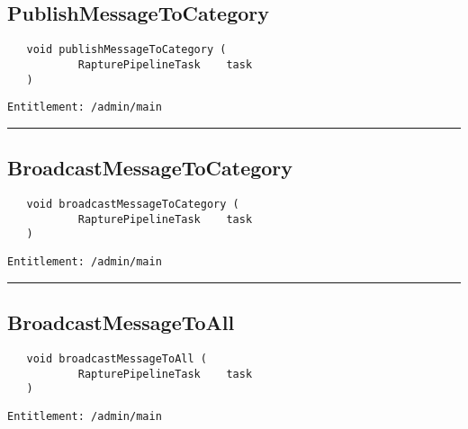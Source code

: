 \subsection{PublishMessageToCategory}
\label{Api:PublishMessageToCategory}
\begin{Verbatim}
   void publishMessageToCategory (
           RapturePipelineTask    task
   )
\end{Verbatim}
\begin{Verbatim}[formatcom=\color{Maroon}]
  Entitlement: /admin/main
\end{Verbatim}



\rule{12cm}{2pt}
\subsection{BroadcastMessageToCategory}
\label{Api:BroadcastMessageToCategory}
\begin{Verbatim}
   void broadcastMessageToCategory (
           RapturePipelineTask    task
   )
\end{Verbatim}
\begin{Verbatim}[formatcom=\color{Maroon}]
  Entitlement: /admin/main
\end{Verbatim}



\rule{12cm}{2pt}
\subsection{BroadcastMessageToAll}
\label{Api:BroadcastMessageToAll}
\begin{Verbatim}
   void broadcastMessageToAll (
           RapturePipelineTask    task
   )
\end{Verbatim}
\begin{Verbatim}[formatcom=\color{Maroon}]
  Entitlement: /admin/main
\end{Verbatim}




